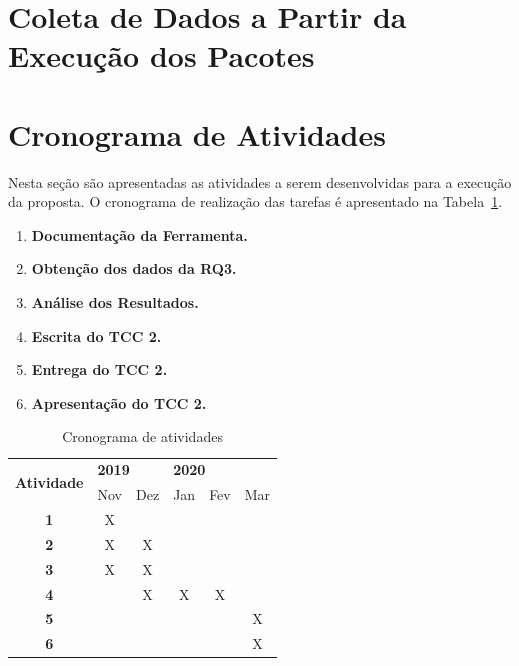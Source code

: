 \section{Coleta de Dados a Partir da Execução dos Pacotes}
\label{sec:col_dados}


\section{Cronograma de Atividades}
\label{sec:cronograma}

Nesta seção são apresentadas as atividades a serem desenvolvidas para a execução da proposta. O cronograma de realização das tarefas é apresentado na Tabela~\ref{tab:cronograma}.

\begin{enumerate}
\item \textbf{Documentação da Ferramenta.}
\item \textbf{Obtenção dos dados da RQ3.}
\item \textbf{Análise dos Resultados.}
\item \textbf{Escrita do TCC 2.}
\item \textbf{Entrega do TCC 2.}
\item \textbf{Apresentação do TCC 2.}
\end{enumerate}

\begin{table}[h!]
\centering
\renewcommand{\arraystretch}{1.3}
\caption{Cronograma de atividades}
\label{tab:cronograma}
\begin{tabular}{|c|c|c|c|c|c|}
\hline
\multirow{2}{*}{\textbf{Atividade}} & \multicolumn{2}{l|}{\textbf{2019}} & \multicolumn{3}{l|}{\textbf{2020}} \\ \cline{2-6} 
             & Nov & Dez & Jan & Fev & Mar \\ \hline
\textbf{1}   &  X  &     &     &     &     \\ \hline
\textbf{2}   &  X  &  X  &     &     &     \\ \hline
\textbf{3}   &  X  &  X  &     &     &     \\ \hline
\textbf{4}   &     &  X  &  X  &  X  &     \\ \hline
\textbf{5}   &     &     &     &     &  X  \\ \hline
\textbf{6}   &     &     &     &     &  X  \\ \hline
\end{tabular}
\end{table}